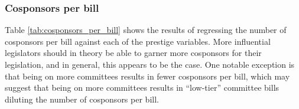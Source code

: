 \documentclass{article}
\begin{document}
\subsubsection{Cosponsors per bill}
Table \ref{tab:cosponsors_per_bill} shows the results of regressing the number of cosponsors per bill against each of the prestige variables. More influential legislators should in theory be able to garner more cosponsors for their legislation, and in general, this appears to be the case. One notable exception is that being on more committees results in fewer cosponsors per bill, which may suggest that being on more committees results in ``low-tier'' committee bills diluting the number of cosponsors per bill.
\begin{table}[!htbp]
    \noindent
    \caption{Cosponsors per bill} 
    \label{tab:cosponsors_per_bill} 
\end{table}
\end{document}

